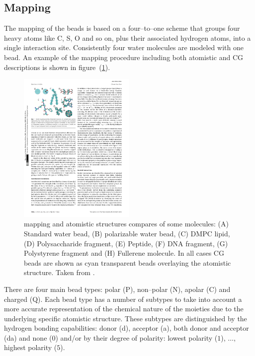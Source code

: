 \subsection{Mapping}
The mapping of the \martini{} beads is based on a four--to--one scheme that groups four heavy atoms like C, S, O
and so on, plus their associated hydrogen atoms, into a single interaction site. Consistently four water
molecules are modeled with one \martini{} bead. An example of the mapping procedure including both atomistic and
\ac{CG} descriptions is shown in figure~(\ref{fig:martiniMapping}).
\begin{figure}[!ht]
	\centering
	\includegraphics[width=0.5\textwidth]{img/martiniMapping}
	\caption{\martini{} mapping and atomistic structures compares of some molecules: (A) Standard water bead, (B) polarizable water bead, (C) \acs{DMPC} lipid, (D) Polysaccharide fragment, (E) Peptide, (F) DNA fragment, (G) Polystyrene fragment and (H) Fullerene molecule. In all cases \martini{} \acs{CG} beads are shown as cyan transparent beads overlaying the atomistic structure. Taken from \cite{MartiniReview}.}%
	\label{fig:martiniMapping}
\end{figure}

There are four main bead types: polar (P), non--polar (N), apolar (C) and charged (Q). Each bead type has a
number of subtypes to take into account a more accurate representation of the chemical nature of the moieties due
to the underlying specific atomistic structure. These subtypes are distinguished by the hydrogen bonding
capabilities: donor (d), acceptor (a), both donor and acceptor (da) and none ($0$) and/or by their degree of
polarity: lowest polarity ($1$), $\dots$, highest polarity ($5$).

